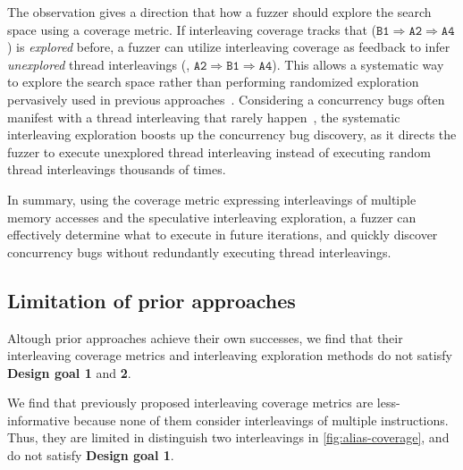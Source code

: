 %
The observation gives a direction that how a fuzzer should explore the
search space using a coverage metric.  If interleaving coverage tracks
that ($\texttt{B1} \Rightarrow \texttt{A2} \Rightarrow \texttt{A4}$)
is \textit{explored} before, a fuzzer can utilize interleaving
coverage as feedback to infer \textit{unexplored} thread interleavings
(\eg, $\texttt{A2} \Rightarrow \texttt{B1} \Rightarrow \texttt{A4}$).
%
This allows a systematic way to explore the search space rather than
performing randomized exploration pervasively used in previous
approaches~\cite{ski, krace, pctalgorithm, muzz}.
%
Considering a concurrency bugs often manifest with a thread
interleaving that rarely happen~\cite{exprace}, the systematic
interleaving exploration boosts up the concurrency bug discovery, as
it directs the fuzzer to execute unexplored thread interleaving
instead of executing random thread interleavings thousands of times.

In summary, using the coverage metric expressing interleavings of
multiple memory accesses and the speculative interleaving exploration,
a fuzzer can effectively determine what to execute in future
iterations, and quickly discover concurrency bugs without redundantly
executing thread interleavings.


\subsection{Limitation of prior approaches}
\label{ss:existingapproaches}
%
%   

%
Altough prior approaches achieve their own successes, we find that
their interleaving coverage metrics and interleaving exploration
methods do not satisfy \textbf{Design goal 1} and \textbf{2}.


%
We find that previously proposed interleaving coverage metrics are
less-informative because none of them consider interleavings of
multiple instructions. Thus, they are limited in distinguish two
interleavings in \autoref{fig:alias-coverage}, and do not satisfy
\textbf{Design goal 1}.


